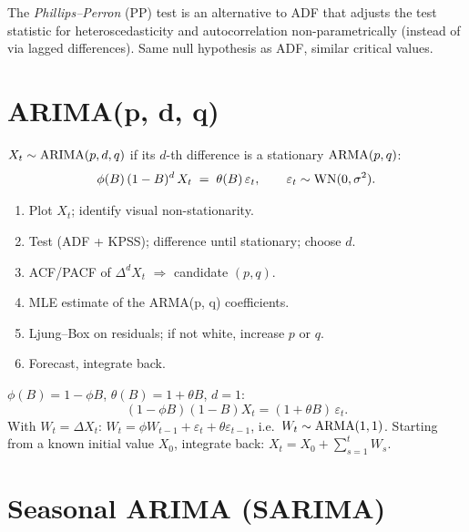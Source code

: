 \begin{rembox}
The \emph{Phillips--Perron} (PP) test is an alternative to ADF that
adjusts the test statistic for heteroscedasticity and autocorrelation
non-parametrically (instead of via lagged differences). Same null
hypothesis as ADF, similar critical values.
\end{rembox}

\section{ARIMA(p, d, q)}
\label{sec:arima}

\begin{defbox}
\label{def:arima}
$X_t \sim \mathrm{ARIMA}(p,d,q)$ if its $d$-th difference is a stationary
$\mathrm{ARMA}(p,q)$:
\[
  \phi(B)\, (1 - B)^d\, X_t \;=\; \theta(B)\, \varepsilon_t,
  \qquad \varepsilon_t \sim \mathrm{WN}(0, \sigma^2).
\]
\end{defbox}

\begin{rembox}
\begin{enumerate}
  \item Plot $X_t$; identify visual non-stationarity.
  \item Test (ADF + KPSS); difference until stationary; choose $d$.
  \item ACF/PACF of $\Delta^d X_t$ $\Rightarrow$ candidate $(p, q)$.
  \item MLE estimate of the ARMA(p, q) coefficients.
  \item Ljung--Box on residuals; if not white, increase $p$ or $q$.
  \item Forecast, integrate back.
\end{enumerate}
\end{rembox}

\begin{exbox}[ARIMA(1, 1, 1)]
\label{ex:arima-111}
$\phi(B) = 1 - \phi B$, $\theta(B) = 1 + \theta B$, $d = 1$:
\[
  (1 - \phi B)(1 - B) X_t = (1 + \theta B)\, \varepsilon_t.
\]
With $W_t = \Delta X_t$:
$W_t = \phi W_{t-1} + \varepsilon_t + \theta \varepsilon_{t-1}$,
i.e.\ $W_t \sim \mathrm{ARMA}(1,1)$. Starting from a known initial value
$X_0$, integrate back: $X_t = X_0 + \sum_{s = 1}^{t} W_s$.
\end{exbox}

\section{Seasonal ARIMA (SARIMA)}
\label{sec:sarima}


